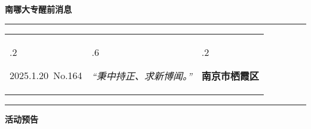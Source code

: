 \documentclass[letterpaper, 12pt]{article}
\begin{document}
\begin{center}
    \Huge\textbf{南哪大专醒前消息}
\end{center}
\vspace{4mm}
\hrule
\renewcommand\tabularxcolumn[1]{m{#1}}
\begin{tabularx}{\textwidth}{>{\hsize.2\hsize}X>{\hsize.6\hsize}X>{\hsize.2\hsize}X}
    \begin{flushleft}
        2025.1.20\, No.164
    \end{flushleft}
    &
    \begin{center}
        \textit{“秉中持正、求新博闻。”}
    \end{center}
    &
    \begin{flushright}
        \textbf{南京市栖霞区}
    \end{flushright}
\end{tabularx}
\vspace{-3.5mm}
\hrule
\vspace{4mm}
\centerline{\huge\textbf{活动预告}}
\end{document}
